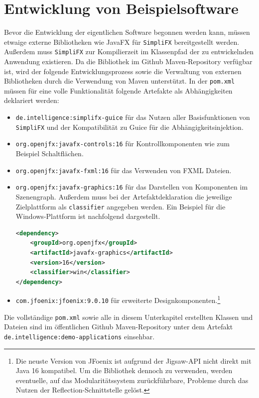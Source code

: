 \section{Entwicklung von Beispielsoftware}
\label{entwicklung_von_beispielsoftware}
\noindent Bevor die Entwicklung der eigentlichen Software begonnen werden kann, müssen etwaige externe Bibliotheken wie JavaFX für \texttt{SimpliFX} bereitgestellt werden. Außerdem muss \texttt{SimpliFX} zur Kompilierzeit im Klassenpfad der zu entwickelnden Anwendung existieren. Da die Bibliothek im Github Maven-Repository verfügbar ist, wird der folgende Entwicklungsprozess sowie die Verwaltung von externen Bibliotheken durch die Verwendung von Maven unterstützt. In der \texttt{pom.xml} müssen für eine volle Funktionalität folgende Artefakte als Abhängigkeiten deklariert werden:
\begin{itemize}
	\item \texttt{de.intelligence:simplifx-guice} für das Nutzen aller Basisfunktionen von \texttt{SimpliFX} und der Kompatibilität zu Guice für die Abhängigkeitsinjektion.
	\item \texttt{org.openjfx:javafx-controls:16} für Kontrollkomponenten wie zum Beispiel Schaltflächen.
	\item \texttt{org.openjfx:javafx-fxml:16} für das Verwenden von FXML Dateien.
	\item \texttt{org.openjfx:javafx-graphics:16} für das Darstellen von Komponenten im Szenengraph. Außerdem muss bei der Artefaktdeklaration die jeweilige Zielplattform als \texttt{classifier} angegeben werden. Ein Beispiel für die Windows-Plattform ist nachfolgend dargestellt.
	\begin{lstlisting}[language=XML, frame=none, belowskip=0pt]
<dependency>
    <groupId>org.openjfx</groupId>
    <artifactId>javafx-graphics</artifactId>
    <version>16</version>
    <classifier>win</classifier>
</dependency>	
	\end{lstlisting}
	\item \texttt{com.jfoenix:jfoenix:9.0.10} für erweiterte Designkomponenten.\footnote{Die neuste Version von JFoenix ist aufgrund der Jigsaw-API nicht direkt mit Java 16 kompatibel. Um die Bibliothek dennoch zu verwenden, werden eventuelle, auf das Modularitätssystem zurückführbare, Probleme durch das Nutzen der Reflection-Schnittstelle gelöst.}
\end{itemize}
Die vollständige \texttt{pom.xml} sowie alle in diesem Unterkapitel erstellten Klassen und Dateien sind im öffentlichen Github Maven-Repository unter dem Artefakt \texttt{de.intelligence:demo-applications} einsehbar.
